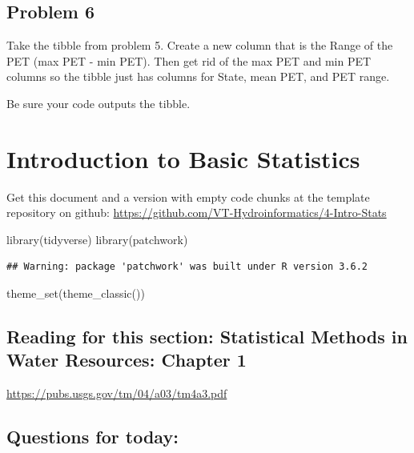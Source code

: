 \documentclass[
]{book}
\newenvironment{Shaded}{\begin{snugshade}}{\end{snugshade}}
\newcommand{\FunctionTok}[1]{\textcolor[rgb]{0.00,0.00,0.00}{#1}}
\newcommand{\NormalTok}[1]{#1}
\begin{document}
\hypertarget{problem-6}{%
\section{Problem 6}\label{problem-6}}

Take the tibble from problem 5. Create a new column that is the Range of the PET (max PET - min PET). Then get rid of the max PET and min PET columns so the tibble just has columns for State, mean PET, and PET range.

Be sure your code outputs the tibble.

\hypertarget{stats}{%
\chapter{Introduction to Basic Statistics}\label{stats}}

Get this document and a version with empty code chunks at the template repository on github: \url{https://github.com/VT-Hydroinformatics/4-Intro-Stats}

\begin{Shaded}
\begin{Highlighting}[]
\FunctionTok{library}\NormalTok{(tidyverse)}
\FunctionTok{library}\NormalTok{(patchwork)}
\end{Highlighting}
\end{Shaded}

\begin{verbatim}
## Warning: package 'patchwork' was built under R version 3.6.2
\end{verbatim}

\begin{Shaded}
\begin{Highlighting}[]
\FunctionTok{theme\_set}\NormalTok{(}\FunctionTok{theme\_classic}\NormalTok{())}
\end{Highlighting}
\end{Shaded}

\hypertarget{reading-for-this-section-statistical-methods-in-water-resources-chapter-1}{%
\section{Reading for this section: Statistical Methods in Water Resources: Chapter 1}\label{reading-for-this-section-statistical-methods-in-water-resources-chapter-1}}

\url{https://pubs.usgs.gov/tm/04/a03/tm4a3.pdf}

\hypertarget{questions-for-today}{%
\section{Questions for today:}\label{questions-for-today}}
\end{document}
